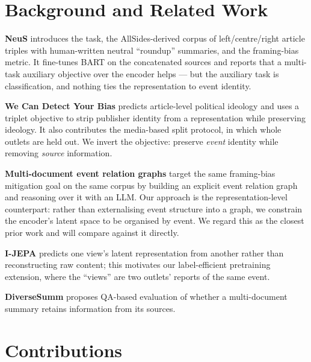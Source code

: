 \documentclass[10pt,twocolumn,a4paper]{article}
\begin{document}
\section{Background and Related Work}

\textbf{NeuS} \cite{lee2022neus} introduces the task, the AllSides-derived
corpus of left/centre/right article triples with human-written neutral
``roundup'' summaries, and the framing-bias metric. It fine-tunes BART
\cite{lewis2020bart} on the concatenated sources and reports that a multi-task
auxiliary objective over the encoder helps --- but the auxiliary task is
classification, and nothing ties the representation to event identity.

\textbf{We Can Detect Your Bias} \cite{baly2020detect} predicts article-level
political ideology and uses a triplet objective to strip publisher identity from
a representation while preserving ideology. It also contributes the media-based
split protocol, in which whole outlets are held out. We invert the objective:
preserve \emph{event} identity while removing \emph{source} information.

\textbf{Multi-document event relation graphs} \cite{lei2024multidoc} target the
same framing-bias mitigation goal on the same corpus by building an explicit
event relation graph and reasoning over it with an LLM. Our approach is the
representation-level counterpart: rather than externalising event structure into
a graph, we constrain the encoder's latent space to be organised by event. We
regard this as the closest prior work and will compare against it directly.

\textbf{I-JEPA} \cite{assran2023ijepa} predicts one view's latent representation
from another rather than reconstructing raw content; this motivates our
label-efficient pretraining extension, where the ``views'' are two outlets'
reports of the same event.

\textbf{DiverseSumm} \cite{huang2024diversesumm} proposes QA-based evaluation of
whether a multi-document summary retains information from its sources.

\section{Contributions}
\end{document}
